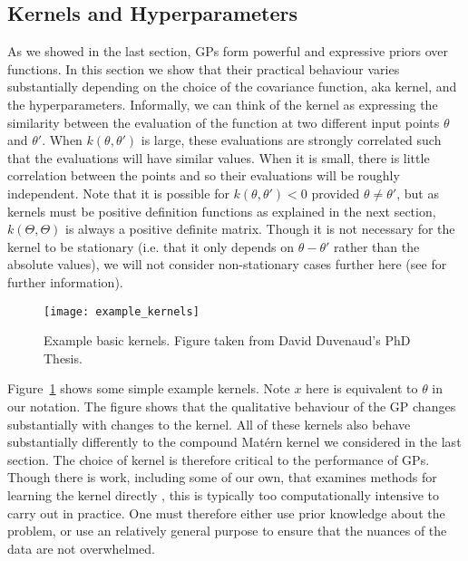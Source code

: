 \subsection{Kernels and Hyperparameters}
\label{sec:opt:gps:kernels}

As we showed in the last section, GPs form powerful and expressive priors over functions.
In this section we show that their practical behaviour varies substantially depending on the
choice of the covariance function, aka kernel, and the hyperparameters.   Informally, we can think
of the kernel as expressing the similarity between the evaluation of the function at two different input
points $\theta$ and $\theta'$.  When $k(\theta,\theta')$ is large, these evaluations are strongly
correlated such that the evaluations will have similar values.  When it is small, there is little
correlation between the points and so their evaluations will be roughly independent.  Note that
it is possible for $k(\theta,\theta')<0$ provided $\theta\neq\theta'$, but as kernels must
be positive definition functions as explained in the next section, $k\left(\Theta,\Theta\right)$ is
always a positive definite matrix.  Though it is not necessary for the kernel to be stationary (i.e.
that it only depends on $\theta-\theta'$ rather than the absolute values), we will not
consider non-stationary cases further here (see \cite{rasmussen2006gaussian} for further
information).

\begin{figure}[t]
	\centering
	\texttt{[image: example\_kernels]}
	\caption{Example basic kernels.  Figure taken from David Duvenaud's PhD
		Thesis. \label{fig:opt:example_kernels_duv}}
\end{figure}

Figure~\ref{fig:opt:example_kernels_duv}  shows
some simple example kernels.  Note $x$ here is equivalent to $\theta$ in our
notation.  The figure shows that the qualitative behaviour of the GP changes
substantially with changes to the kernel.  All of these kernels also behave
substantially differently to the compound Mat\'{e}rn kernel we considered in the last section.
The choice of kernel is therefore
critical to the performance of GPs.  Though there is work, including some of
our own, that examines methods 
for learning the kernel directly
\cite{duvenaud2013structure,lloyd2014automatic,wilson2014fast,janz2016probstruct}, 
this is typically too computationally intensive
to carry out in practice.  One must therefore either use prior knowledge about the
problem, or use an relatively general purpose to ensure that the nuances of the
data are not overwhelmed.

